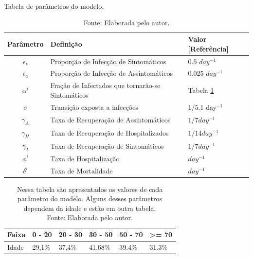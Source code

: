 \begin{table}[H]
  \caption{Tabela de parâmetros do modelo.}
  \begin{tabular}{cll}
  Parâmetro & Definição & Valor [Referência] \\
  \hline
  \rowcolor{Gray}
  $\epsilon_s$ & Proporção de Infecção de Sintomáticos & 0.5 $day^{-1}$\\
  $\epsilon_a$ & Proporção de Infecção de Assintomáticos& 0.025 $day^{-1}$\\ 
  \rowcolor{Gray}
  $\alpha^i$   & Fração de Infectados que tornarão-se Sintomáticos & Tabela \ref{alpha} \cite{Jung2020}\\
  $\sigma$     & Transição exposta a infecções& 1/5.1 day$^{-1}$\\
  \rowcolor{Gray}
  $\gamma_A$   & Taxa de Recuperação de Assintomáticos& $1/7 day^{-1}$\\
  $\gamma_H$   & Taxa de Recuperação de Hospitalizados& $1/14 day^{-1}$\\
  \rowcolor{Gray}
  $\gamma_I$   & Taxa de Recuperação de Sintomáticos & $1/7 day^{-1}$\\
  $\phi^i$     & Taxa de Hospitalização & $day^{-1}$\\
  \rowcolor{Gray}
  $\delta^i$   & Taxa de Mortalidade & $day^{-1}$          
  \end{tabular}

  \caption*{Fonte: Elaborada pelo autor.}

\end{table}


\begin{table}[H]
  \centering
  \begin{tabular}{llllll}
  Faixa & 0 - 20 & 20 - 30 & 30 - 50 & 50 - 70 & \textgreater{}= 70 \\
  \hline
  Idade & 29,1\% & 37,4\%  & 41.68\% & 39.4\%  & 31.3\%            
  \end{tabular}

  \caption{Nessa tabela são apresentados os valores de cada parâmetro do modelo. Alguns desses parâmetros dependem da idade e estão em outra tabela. \\Fonte: Elaborada pelo autor.}

  \label{alpha}

\end{table}